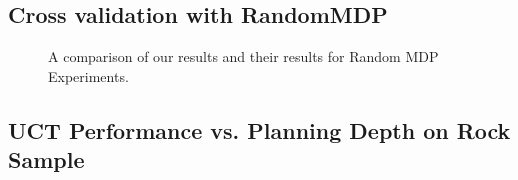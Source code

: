 \documentclass[11pt]{article} %
\begin{document}
\subsection{Cross validation with RandomMDP}

\begin{figure}
\centering
{}
\hspace{4mm}
\caption{A comparison of our results and their results for Random MDP Experiments.}
\end{figure}




\subsection{UCT Performance vs. Planning Depth on Rock Sample}
\end{document}
